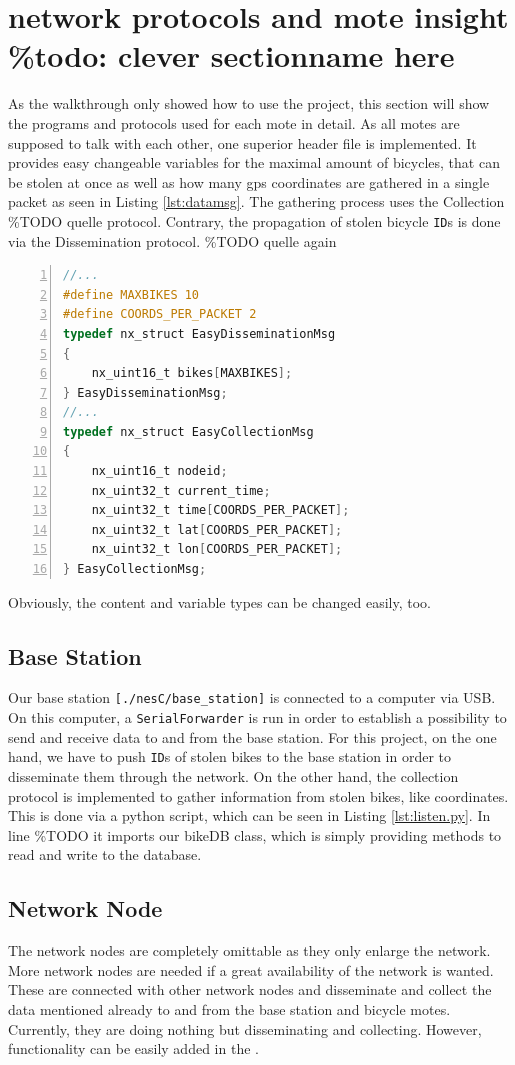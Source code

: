 \documentclass[a4paper]{article}
\begin{document}
\section{network protocols and mote insight \%todo: clever sectionname here}\label{sec:insight}
As the walkthrough only showed how to use the project, this section will show the programs and protocols used for each mote in detail. As all motes are supposed to talk with each other, one superior header file is implemented. It provides easy changeable variables for the maximal amount of bicycles, that can be stolen at once as well as how many gps coordinates are gathered in a single packet as seen in Listing \ref{lst:datamsg}. The gathering process uses the Collection \%TODO quelle protocol. Contrary, the propagation of stolen bicycle \texttt{ID}s is done via the Dissemination protocol. \%TODO quelle again 
\begin{lstlisting}[numbers=left, frame=single,language=C, captionpos=b, caption={DataMsg.h, content of packets}, label=lst:datamsg]
//...
#define MAXBIKES 10
#define COORDS_PER_PACKET 2
typedef nx_struct EasyDisseminationMsg 
{
    nx_uint16_t bikes[MAXBIKES];
} EasyDisseminationMsg;
//...
typedef nx_struct EasyCollectionMsg 
{
    nx_uint16_t nodeid;
    nx_uint32_t current_time;
    nx_uint32_t time[COORDS_PER_PACKET];
    nx_uint32_t lat[COORDS_PER_PACKET];
    nx_uint32_t lon[COORDS_PER_PACKET];
} EasyCollectionMsg;
\end{lstlisting}
Obviously, the content and variable types can be changed easily, too.
\subsection{Base Station}
Our base station \texttt{[./nesC/base\_station]} is connected to a computer via USB. On this computer, a \texttt{SerialForwarder} is run in order to establish a possibility to send and receive data to and from the base station. For this project, on the one hand, we have to push \texttt{ID}s of stolen bikes to the base station in order to disseminate them through the network. On the other hand, the collection protocol is implemented to gather information from stolen bikes, like coordinates. This is done via a python script, which can be seen in Listing \ref{lst:listen.py}. In line \%TODO it imports our bikeDB class, which is simply providing methods to read and write to the database.\\

\subsection{Network Node}
The network nodes are completely omittable as they only enlarge the network. More network nodes are needed if a great availability of the network is wanted. These are connected with other network nodes and disseminate and collect the data mentioned already to and from the base station and bicycle motes. Currently, they are doing nothing but disseminating and collecting. However, functionality can be easily added in the \texttt{}.
\end{document}
